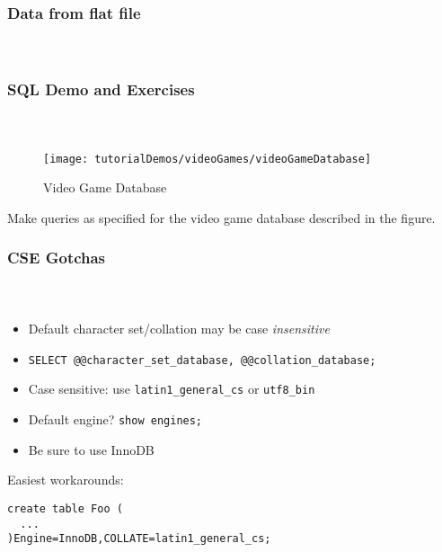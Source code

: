 \documentclass{beamer}
\begin{document}
\begin{frame}
  \frametitle{Data from flat file}
  \framesubtitle{~}



\end{frame}

\begin{frame}
  \frametitle{SQL Demo and Exercises}
  \framesubtitle{~}

\begin{figure}
\centering
\texttt{[image: tutorialDemos/videoGames/videoGameDatabase]}
\caption{Video Game Database}
\end{figure}

Make queries as specified for the video game database described in the
figure.

\end{frame}

\begin{frame}[fragile]
  \frametitle{CSE Gotchas}
  \framesubtitle{~}

\begin{itemize}
  \item Default character set/collation may be case \emph{insensitive}
  \item \texttt{SELECT @@character_set_database, @@collation_database;}
  \item Case sensitive: use \texttt{latin1_general_cs} or \texttt{utf8_bin}
  \item Default engine?  \texttt{show engines;}
  \item Be sure to use InnoDB
\end{itemize}

Easiest workarounds:

\begin{verbatim}
create table Foo ( 
  ...
)Engine=InnoDB,COLLATE=latin1_general_cs;
\end{verbatim}

\end{frame}
\end{document}
